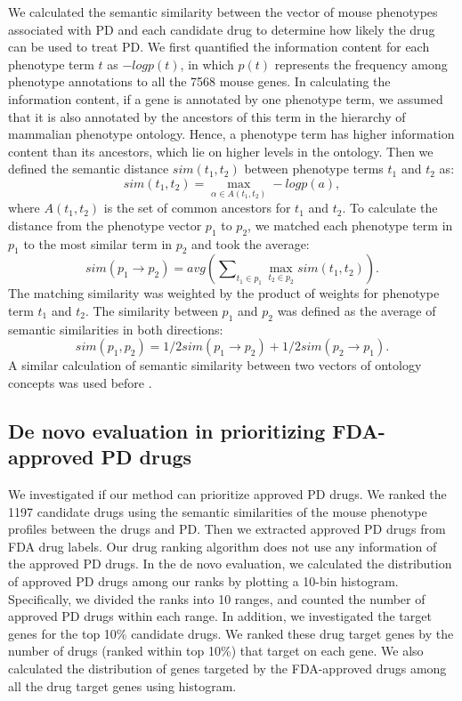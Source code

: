 We calculated the semantic similarity between the vector of mouse phenotypes associated
with PD and each candidate drug to determine how likely the drug can be used to treat PD.
We first quantified the information content for each phenotype term $t$ as $-logp(t)$,
in which $p(t)$ represents the frequency among phenotype annotations to all the 7568 mouse genes.
In calculating the information content, if a gene is annotated by one phenotype term,
we assumed that it is also annotated by the ancestors of this term in the hierarchy of mammalian phenotype ontology.
Hence, a phenotype term has higher information content than its ancestors,
which lie on higher levels in the ontology. Then we defined the semantic distance $sim(t_1,t_2)$
between phenotype terms $t_1$ and $t_2$ as:
\begin{equation}
sim(t_1,t_2)=\max_{\alpha \in A(t_1,t_2)} -log p(a),
\end{equation}
where $A(t_1,t_2)$ is the set of common ancestors for $t_1$ and $t_2$. To calculate the distance
from the phenotype vector $p_1$ to $p_2$, we matched each phenotype term in $p_1$ to the
most similar term in $p_2$ and took the average:
\begin{equation}
sim(p_1 \to p_2)=avg(\sum\nolimits_{t_1 \in p_1}{\max_{t_2 \in p_2}sim(t_1,t_2)}).
\end{equation}
The matching similarity was weighted by the product of weights for phenotype term $t_1$ and $t_2$.
The similarity between $p_1$ and $p_2$ was defined as the average of semantic similarities in both directions:
\begin{equation}
sim(p_1,p_2 )=1/2 sim(p_1 \to p_2 )+1/2 sim(p_2 \to p_1 ).
\end{equation}
A similar calculation of semantic similarity between two vectors of ontology concepts was used before \cite{robinson2008human}.

\subsection{De novo evaluation in prioritizing FDA-approved PD drugs }
We investigated if our method can prioritize approved PD drugs. We ranked the 1197 candidate
drugs using the semantic similarities of the mouse phenotype profiles between the drugs and PD. Then we extracted approved PD drugs from FDA drug labels. Our drug ranking algorithm does not use any information of the approved PD drugs. In the de novo evaluation, we calculated the distribution of approved PD drugs among our ranks by plotting a 10-bin histogram. Specifically, we divided the ranks into 10 ranges, and counted the number of approved PD drugs within each range. In addition, we investigated the target genes for the top 10\% candidate drugs. We ranked these drug target genes by the number of drugs (ranked within top 10\%) that target on each gene. We also calculated the distribution of genes targeted by the FDA-approved drugs among all the drug target genes using histogram.

